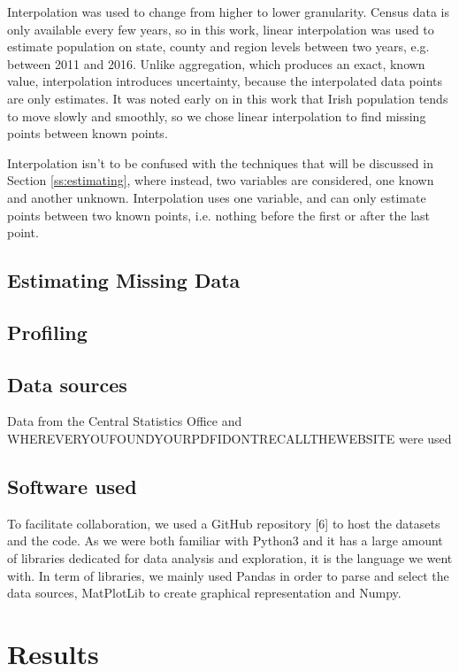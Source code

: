 \documentclass[twocolumn]{article}
\begin{document}
Interpolation was used to change from higher to lower granularity.  Census data
is only available every few years, so in this work, linear interpolation was
used to estimate population on state, county and region levels between two
years, e.g. between 2011 and 2016.  Unlike aggregation, which produces an
exact, known value, interpolation introduces uncertainty, because the
interpolated data points are only estimates.  It was noted early on in this
work that Irish population tends to move slowly and smoothly, so we chose
linear interpolation to find missing points between known points.

Interpolation isn't to be confused with the techniques that will be discussed in
Section \ref{ss:estimating}, where instead, two variables are considered, one known
and another unknown.  Interpolation uses one variable, and can only estimate points between
two known points, i.e. nothing before the first or after the last point.

\subsection{Estimating Missing Data\label{ss:estimating}}
\subsection{Profiling\label{ss:profiling}}
\subsection{Data sources}
Data from the Central Statistics Office and
WHEREVERYOUFOUNDYOURPDFIDONTRECALLTHEWEBSITE were used

\subsection{Software used}
To facilitate collaboration, we used a GitHub repository [6] to host the datasets and the code. As we were both familiar with Python3 and it has a large amount of libraries dedicated for data analysis and exploration, it is the language we went with. In term of libraries, we mainly used Pandas in order to parse and select the data sources, MatPlotLib to create graphical representation and Numpy.

\section{Results}
\end{document}
